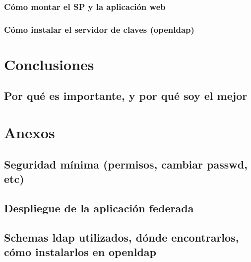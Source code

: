         \subsection{Cómo montar el SP y la aplicación web}
        \subsection{Cómo instalar el servidor de claves (openldap)}


\chapter{Conclusiones}
    \section{Por qué es importante, y por qué soy el mejor}



\chapter{Anexos}
    \section{Seguridad mínima (permisos, cambiar passwd, etc)}
    \section{Despliegue de la aplicación federada}
    \section{Schemas ldap utilizados, dónde encontrarlos, cómo instalarlos
    en openldap}

\newpage



